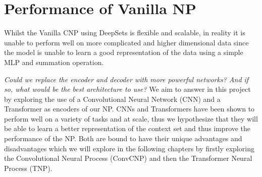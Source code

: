 \documentclass[../../main.tex]{subfiles}
\begin{document}










\section{Performance of Vanilla NP}

Whilst the Vanilla CNP using DeepSets is flexible and scalable, in reality it is unable to perform well on more complicated and higher dimensional data since the model is unable to learn a good representation of the data using a simple MLP and summation operation. 

\emph{Could we replace the encoder and decoder with more powerful networks? And if so, what would be the best architecture to use?} We aim to answer in this project by exploring the use of a Convolutional Neural Network (CNN) and a Transformer as encoders of our NP. CNNs and Transformers have been shown to perform well on a variety of tasks and at scale, thus we hypothesize that they will be able to learn a better representation of the context set and thus improve the performance of the NP.
Both are bound to have their unique advantages and disadvantages which we will explore in the following chapters by firstly exploring the Convolutional Neural Process (ConvCNP) and then the Transformer Neural Process (TNP).



\end{document}
